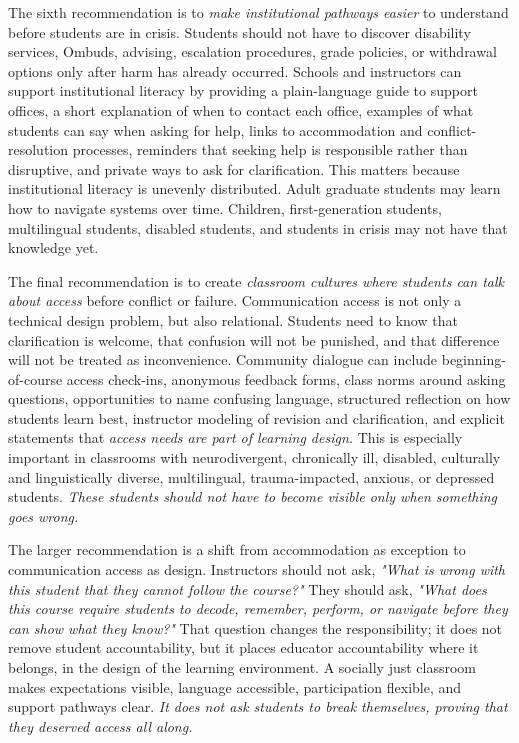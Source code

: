 The sixth recommendation is to \textit{make institutional pathways easier} to understand before students are in crisis. Students should not have to discover disability services, Ombuds, advising, escalation procedures, grade policies, or withdrawal options only after harm has already occurred. Schools and instructors can support institutional literacy by providing a plain-language guide to support offices, a short explanation of when to contact each office, examples of what students can say when asking for help, links to accommodation and conflict-resolution processes, reminders that seeking help is responsible rather than disruptive, and private ways to ask for clarification. This matters because institutional literacy is unevenly distributed. Adult graduate students may learn how to navigate systems over time. Children, first-generation students, multilingual students, disabled students, and students in crisis may not have that knowledge yet.


The final recommendation is to create \textit{classroom cultures where students can talk about access} before conflict or failure. Communication access is not only a technical design problem, but also relational. Students need to know that clarification is welcome, that confusion will not be punished, and that difference will not be treated as inconvenience. Community dialogue can include beginning-of-course access check-ins, anonymous feedback forms, class norms around asking questions, opportunities to name confusing language, structured reflection on how students learn best, instructor modeling of revision and clarification, and explicit statements that \textit{access needs are part of learning design.} This is especially important in classrooms with neurodivergent, chronically ill, disabled, culturally and linguistically diverse, multilingual, trauma-impacted, anxious, or depressed students. \textit{These students should not have to become visible only when something goes wrong.}


The larger recommendation is a shift from accommodation as exception to communication access as design. Instructors should not ask, \textit{"What is wrong with this student that they cannot follow the course?"} They should ask, \textit{"What does this course require students to decode, remember, perform, or navigate before they can show what they know?"} That question changes the responsibility; it does not remove student accountability, but it places educator accountability where it belongs, in the design of the learning environment. A socially just classroom makes expectations visible, language accessible, participation flexible, and support pathways clear. \textit{It does not ask students to break themselves, proving that they deserved access all along.}
